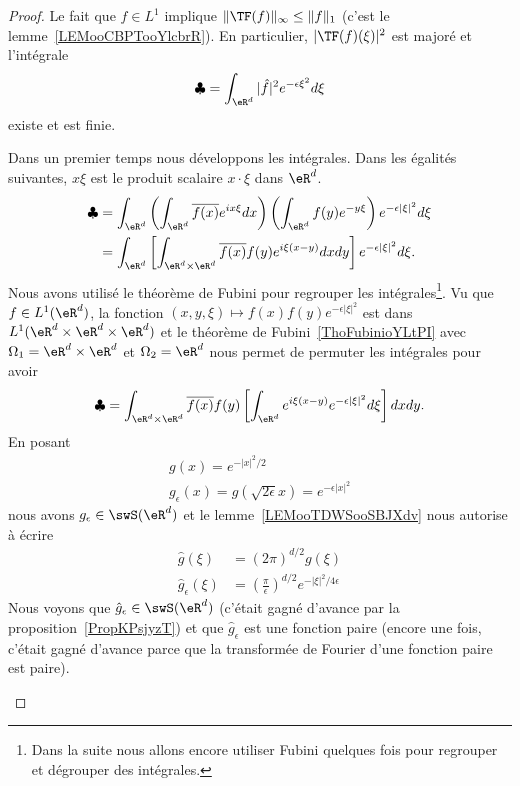 \begin{proof}
	Le fait que \( f\in L^1\) implique \( \| \TF(f) \|_{\infty}\leq \| f \|_1\) (c'est le lemme~\ref{LEMooCBPTooYlcbrR}). En particulier, \( | \TF(f)(\xi) |^2\) est majoré et l'intégrale
	\begin{equation}
		\clubsuit=\int_{\eR^d}| \hat f |^2 e^{-\epsilon\xi^2}d\xi
	\end{equation}
	existe et est finie.
	\begin{subproof}
		Dans un premier temps nous développons les intégrales. Dans les égalités suivantes, \( x\xi\) est le produit scalaire \( x\cdot \xi\) dans \( \eR^d\).
		\begin{subequations}
			\begin{align}
				\clubsuit & =\int_{\eR^d}\left( \int_{\eR^d} \overline{ f(x) } e^{ix\xi}dx \right)\left( \int_{\eR^d} f(y)  e^{-y\xi} \right) e^{- \epsilon | \xi |^2}d\xi \\
				          & =\int_{\eR^d}\left[ \int_{\eR^d\times \eR^d}  \overline{ f(x) }  f(y) e^{i\xi(x-y)}dxdy \right] e^{-\epsilon| \xi |^2}d\xi.
			\end{align}
		\end{subequations}
		Nous avons utilisé le théorème de Fubini pour regrouper les intégrales\footnote{Dans la suite nous allons encore utiliser Fubini quelques fois pour regrouper et dégrouper des intégrales.}. Vu que \( f\in L^1(\eR^d)\), la fonction \( (x,y,\xi)\mapsto f(x)f(y) e^{-\epsilon| \xi |^2}\) est dans \( L^1(\eR^d\times \eR^d\times \eR^d)\) et le théorème de Fubini~\ref{ThoFubinioYLtPI} avec \( \Omega_1=\eR^d\times \eR^d\) et \( \Omega_2=\eR^d\)  nous permet de permuter les intégrales pour avoir
		\begin{equation}        \label{EQooSUYWooCmtFeF}
			\clubsuit=\int_{\eR^d\times \eR^d} \overline{ f(x) }f(y)  \left[ \int_{\eR^d} e^{i\xi(x-y)} e^{-\epsilon| \xi |^2}d\xi \right]dxdy.
		\end{equation}
		En posant
		\begin{subequations}
			\begin{align}
				g(x)= e^{-| x |^2/2} \\
				g_{\epsilon}(x)=g(\sqrt{ 2\epsilon }x)= e^{-\epsilon| x |^2}
			\end{align}
		\end{subequations}
		nous avons \( g_{\epsilon}\in \swS(\eR^d)\) et le lemme~\ref{LEMooTDWSooSBJXdv} nous autorise à écrire
		\begin{subequations}
			\begin{align}
				\hat g(\xi)            & =(2\pi)^{d/2}g(\xi)                                                     \\
				\hat g_{\epsilon}(\xi) & =\left( \frac{ \pi }{ \epsilon } \right)^{d/2} e^{-| \xi |^2/4\epsilon}
			\end{align}
		\end{subequations}
		Nous voyons que \( \hat g_{\epsilon}\in\swS(\eR^d)\) (c'était gagné d'avance par la proposition~\ref{PropKPsjyzT}) et que \( \hat g_{\epsilon}\) est une fonction paire (encore une fois, c'était gagné d'avance parce que la transformée de Fourier d'une fonction paire est paire).


\end{subproof}
\end{proof}

